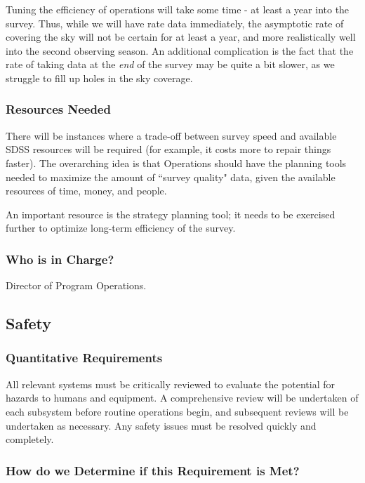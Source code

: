 Tuning the efficiency of operations will take some time - at least a year 
into the survey.  Thus, while we will have rate data immediately, the 
asymptotic rate of covering the sky will not be certain for at least a year, 
and more realistically well into the second observing season.  An
additional complication is the fact that the rate of taking data at
the {\em end} of the survey may be quite a bit slower, as we struggle
to fill up holes in the sky coverage. 

\subsubsection{Resources Needed}

There will be instances where a trade-off between survey speed and 
available SDSS resources will be required (for example, it costs more to 
repair things faster).  The overarching idea is that Operations should have 
the planning tools needed to maximize the amount of ``survey quality" data, 
given the available resources of time, money, and people. 

An important resource is the strategy planning tool; it needs to be
exercised further to optimize long-term efficiency of the survey. 

\subsubsection{Who is in Charge?}

Director of Program Operations. 


\subsection{Safety}
\subsubsection{Quantitative Requirements}

All relevant systems must be critically reviewed to evaluate the potential 
for hazards to humans and equipment.  A comprehensive review will be undertaken of 
each subsystem before routine operations begin, and subsequent reviews 
will be undertaken as necessary.  Any safety issues must be resolved 
quickly and completely.

\subsubsection{How do we Determine if this Requirement is Met?}

